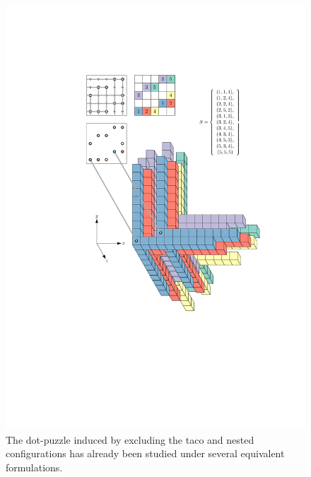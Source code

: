 \documentclass{patmorin}
\begin{document}
\begin{figure}
  \begin{center}
    \includegraphics{figs/tripods}
  \end{center}
  \caption{The dot-puzzle induced by excluding the taco and nested configurations
    has already been studied under several equivalent formulations.}
\end{figure}
\end{document}

